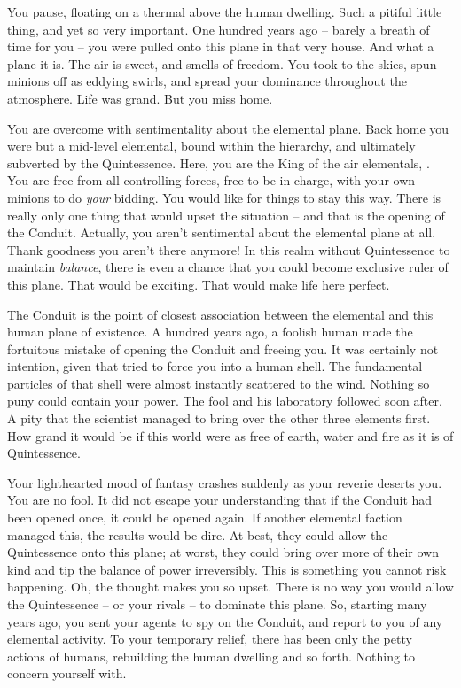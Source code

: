 \documentclass[char]{elementals}
\begin{document}
\name{\cKing{}}


You pause, floating on a thermal above the human dwelling. Such a pitiful little thing, and yet so very important. One hundred years ago -- barely a breath of time for you -- you were pulled onto this plane in that very house. And what a plane it is. The air is sweet, and smells of freedom. You took to the skies, spun minions off as eddying swirls, and spread your dominance throughout the atmosphere.  Life was grand. But you miss home.

You are overcome with sentimentality about the elemental plane. Back home you were but a mid-level elemental, bound within the hierarchy, and ultimately subverted by the Quintessence. Here, you are the King of the air elementals, \cKing{\intro}. You are free from all controlling forces, free to be in charge, with your own minions to do \emph{your} bidding. You would like for things to stay this way. There is really only one thing that would upset the situation -- and that is the opening of the Conduit. Actually, you aren't sentimental about the elemental plane at all. Thank goodness you aren't there anymore! In this realm without Quintessence to maintain \emph{balance}, there is even a chance that you could become exclusive ruler of this plane. That would be exciting. That would make life here perfect.

The Conduit is the point of closest association between the elemental and this human plane of existence. A hundred years ago, a foolish human made the fortuitous mistake of opening the Conduit and freeing you. It was certainly not \cGrandfather{\their} intention, given that \cGrandfather{\they} tried to force you into a human shell. The fundamental particles of that shell were almost instantly scattered to the wind. Nothing so puny could contain your power. The fool and his laboratory followed soon after. A pity that the scientist managed to bring over the other three elements first. How grand it would be if this world were as free of earth, water and fire as it is of Quintessence.

Your lighthearted mood of fantasy crashes suddenly as your reverie deserts you. You are no fool. It did not escape your understanding that if the Conduit had been opened once, it could be opened again. If another elemental faction managed this, the results would be dire. At best, they could allow the Quintessence onto this plane; at worst, they could bring over more of their own kind and tip the balance of power irreversibly. This is something you cannot risk happening. Oh, the thought makes you so upset. There is no way you would allow the Quintessence -- or your rivals -- to dominate this plane. So, starting many years ago, you sent your agents to spy on the Conduit, and report to you of any elemental activity. To your temporary relief, there has been only the petty actions of humans, rebuilding the human dwelling and so forth. Nothing to concern yourself with.
\end{document}
